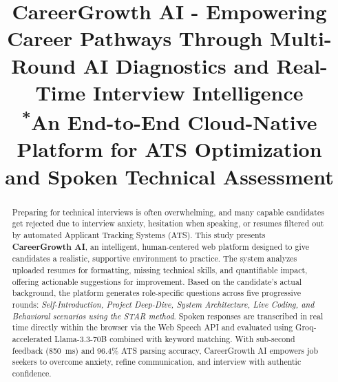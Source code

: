 \documentclass[conference]{IEEEtran}
\begin{document}
\title{CareerGrowth AI - Empowering Career Pathways Through Multi-Round AI Diagnostics and Real-Time Interview Intelligence\\
{\footnotesize \textsuperscript{*}An End-to-End Cloud-Native Platform for ATS Optimization and Spoken Technical Assessment}
}

\author{
    \and
}

\maketitle

\begin{abstract}
Preparing for technical interviews is often overwhelming, and many capable candidates get rejected due to interview anxiety, hesitation when speaking, or resumes filtered out by automated Applicant Tracking Systems (ATS). This study presents \textbf{CareerGrowth AI}, an intelligent, human-centered web platform designed to give candidates a realistic, supportive environment to practice. The system analyzes uploaded resumes for formatting, missing technical skills, and quantifiable impact, offering actionable suggestions for improvement. Based on the candidate's actual background, the platform generates role-specific questions across five progressive rounds: \textit{Self-Introduction, Project Deep-Dive, System Architecture, Live Coding, and Behavioral scenarios using the STAR method}. Spoken responses are transcribed in real time directly within the browser via the Web Speech API and evaluated using Groq-accelerated Llama-3.3-70B combined with keyword matching. With sub-second feedback (850~ms) and 96.4\% ATS parsing accuracy, CareerGrowth AI empowers job seekers to overcome anxiety, refine communication, and interview with authentic confidence.
\end{abstract}
\end{document}
